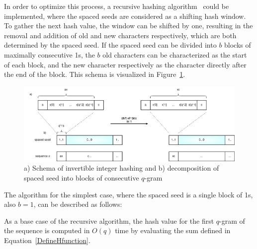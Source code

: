 \documentclass[twoside,a4paper,bsc]{master}
\newcommand{\Qgram}[1]{\(#1\)-gram}
\begin{document}
In order to
optimize this process, a recursive hashing algorithm~\cite{cohen1997recursive}
could be implemented, where the spaced seeds are considered as a shifting hash
window. To gather the next hash value, the window can be shifted by one,
resulting in the removal and addition of old and
new characters respectively, which are both determined by the spaced seed.
If the spaced seed can be divided into \(b\) blocks of maximally consecutive
1s, the \(b\) old characters can be characterized as the start of each block,
and the new character respectively as the character directly after the end of
the block. This schema is visualized in Figure~\ref{fig:recursive}.

\begin{figure}[t]
\begin{center}
\includegraphics[scale=0.45]{graphics/recursive.png}
\end{center}
\caption{a) Schema of invertible integer hashing and b) decomposition of
spaced
seed into blocks of consecutive \Qgram{q}}
\label{fig:recursive}
\end{figure}

The algorithm for the simplest case, where the spaced seed is a single block of
1s, also \(b=1\), can be described as follows:

As a base case of the recursive algorithm, the hash value for the
first \Qgram{q} of the sequence is computed in \(O(q)\) time by evaluating
the sum defined in Equation~\ref{DefineHfunction}.
\end{document}
